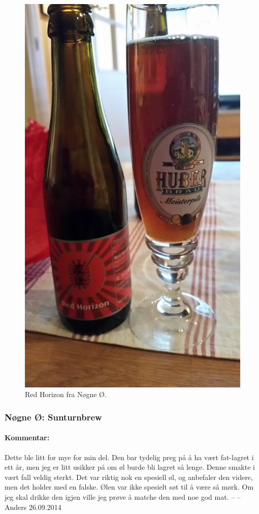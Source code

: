 \documentclass[12pt,a4paper,oneside,norsk]{article}
\begin{document}
\begin{figure} [H] 
\centering
\includegraphics[scale=0.04, angle=-90]{Bilder/Ol/redHorizon1.jpg}
\caption{Red Horizon  fra Nøgne Ø.}
\end{figure}
\newpage

\subsubsection{Nøgne Ø: Sunturnbrew}
\paragraph{Kommentar:} Dette ble litt for mye for min del. Den bar tydelig preg på å ha vært fat-lagret i ett år, men jeg er litt usikker på om øl burde bli lagret så lenge. Denne smakte i vært fall veldig sterkt. Det var riktig nok en spesiell øl, og anbefaler den videre, men det holder med en falske. Ølen var ikke spesielt søt til å være så mørk. Om jeg skal drikke den igjen ville jeg prøve å matche den med noe god mat. 
\newline
-- -- Anders 26.09.2014
\end{document}
